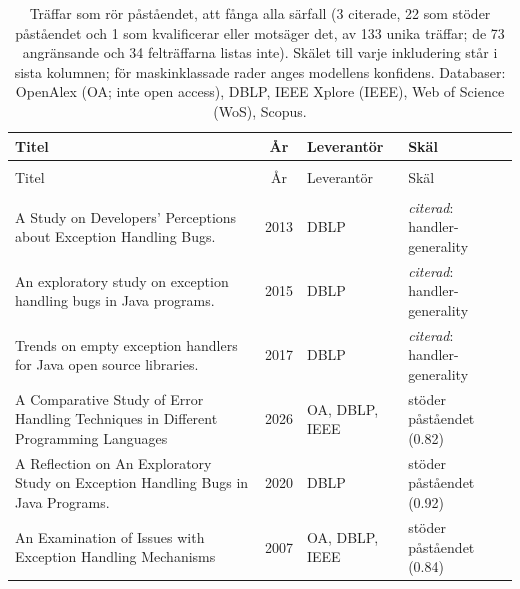 
\begingroup\footnotesize
\begin{longtable}{@{}%
  >{\raggedright\arraybackslash}p{}c%
  >{\raggedright\arraybackslash}p{}%
  >{\raggedright\arraybackslash}p{}@{}}
\caption{Träffar som rör påståendet, att fånga alla särfall (3 citerade, 22 som stöder påståendet och 1 som kvalificerar eller motsäger det, av 133 unika träffar; de 73 angränsande och 34 felträffarna listas inte). Skälet till varje inkludering står i sista kolumnen; för maskinklassade rader anges modellens konfidens. Databaser: OpenAlex (OA; inte open access), DBLP, IEEE Xplore (IEEE), Web of Science (WoS), Scopus.}\label{tab:sok-catchall}\\
\toprule
Titel & År & Leverantör & Skäl \\
\midrule
\endfirsthead
\multicolumn{4}{@{}l}{\emph{\tablename~\thetable{} (forts.)}}\\
\toprule
Titel & År & Leverantör & Skäl \\
\midrule
\endhead
\midrule \multicolumn{4}{r@{}}{\emph{forts.\ på nästa sida}}\\
\endfoot
\bottomrule
\endlastfoot
A Study on Developers' Perceptions about Exception Handling Bugs. & 2013 & DBLP & \emph{citerad}: handler-generality \\
An exploratory study on exception handling bugs in Java programs. & 2015 & DBLP & \emph{citerad}: handler-generality \\
Trends on empty exception handlers for Java open source libraries. & 2017 & DBLP & \emph{citerad}: handler-generality \\
A Comparative Study of Error Handling Techniques in Different Programming Languages & 2026 & OA, DBLP, IEEE & stöder påståendet (0.82) \\
A Reflection on \textquotedbl{}An Exploratory Study on Exception Handling Bugs in Java Programs\textquotedbl{}. & 2020 & DBLP & stöder påståendet (0.92) \\
An Examination of Issues with Exception Handling Mechanisms & 2007 & OA, DBLP, IEEE & stöder påståendet (0.84) \\

\end{longtable}
